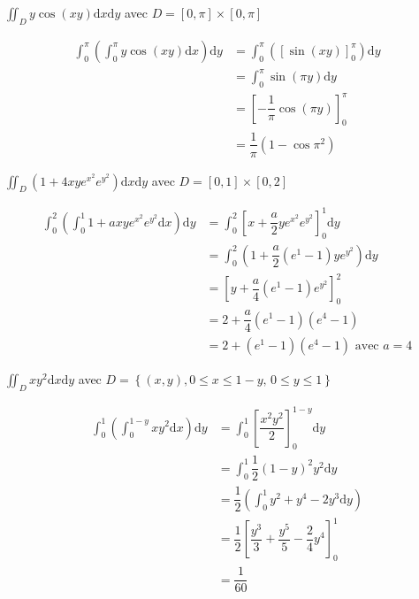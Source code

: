 \begin{enonce}
$\iint_{D}y\cos\left(xy\right)\mathrm{d}x\mathrm{d}y$ avec $D=\left[0,\pi\right]\times\left[0,\pi\right]$
\end{enonce}
%
\begin{corrige}
\begin{align*}
\int_{0}^{\pi}\left(\int_{0}^{\pi}y\cos\left(xy\right)\mathrm{d}x\right)\mathrm{d}y & =\int_{0}^{\pi}\left(\left[\sin\left(xy\right)\right]_{0}^{\pi}\right)\mathrm{d}y\\
 & =\int_{0}^{\pi}\sin\left(\pi y\right)\mathrm{d}y\\
 & =\left[-\dfrac{1}{\pi}\cos\left(\pi y\right)\right]_{0}^{\pi}\\
 & =\dfrac{1}{\pi}\left(1-\cos\pi^{2}\right)
\end{align*}
\end{corrige}
\begin{enonce}
$\iint_{D}\left(1+4xye^{x^{2}}e^{y^{2}}\right)\mathrm{d}x\mathrm{d}y$
avec $D=\left[0,1\right]\times\left[0,2\right]$
\end{enonce}
%
\begin{corrige}
\begin{align*}
\int_{0}^{2}\left(\int_{0}^{1}1+axye^{x^{2}}e^{y^{2}}\mathrm{d}x\right)\mathrm{d}y & =\int_{0}^{2}\left[x+\dfrac{a}{2}ye^{x^{2}}e^{y^{2}}\right]_{0}^{1}\mathrm{d}y\\
 & =\int_{0}^{2}\left(1+\dfrac{a}{2}\left(e^{1}-1\right)ye^{y^{2}}\right)\mathrm{d}y\\
 & =\left[y+\dfrac{a}{4}\left(e^{1}-1\right)e^{y^{2}}\right]_{0}^{\text{2}}\\
 & =2+\dfrac{a}{4}\left(e^{1}-1\right)\left(e^{4}-1\right)\\
 & =2+\left(e^{1}-1\right)\left(e^{4}-1\right)\text{ avec }a=4
\end{align*}
\end{corrige}
\begin{enonce}
$\iint_{D}xy^{2}\mathrm{d}x\mathrm{d}y$ avec $D=\left\{ \left(x,y\right),0\leq x\leq1-y,\,0\leq y\leq1\right\} $
\end{enonce}
%
\begin{corrige}
\begin{align*}
\int_{0}^{1}\left(\int_{0}^{1-y}xy^{2}\mathrm{d}x\right)\mathrm{d}y & =\int_{0}^{1}\left[\dfrac{x^{2}y^{2}}{2}\right]_{0}^{1-y}\mathrm{d}y\\
 & =\int_{0}^{1}\dfrac{1}{2}\left(1-y\right)^{2}y^{2}\mathrm{d}y\\
 & =\dfrac{1}{2}\left(\int_{0}^{1}y^{2}+y^{4}-2y^{3}\mathrm{d}y\right)\\
 & =\dfrac{1}{2}\left[\dfrac{y^{3}}{3}+\dfrac{y^{5}}{5}-\dfrac{2}{4}y^{4}\right]_{0}^{1}\\
 & =\dfrac{1}{60}
\end{align*}
\end{corrige}
